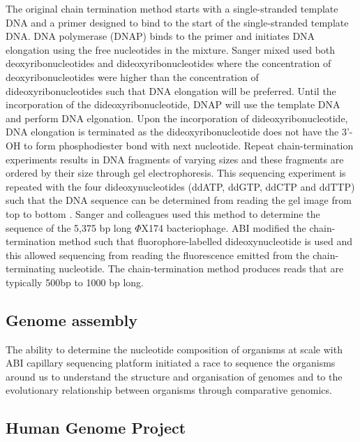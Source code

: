 The original chain termination method starts with a single-stranded template DNA and a primer designed to bind to the start of the single-stranded template DNA. DNA polymerase (DNAP) binds to the primer and initiates DNA elongation using the free nucleotides in the mixture. Sanger mixed used both deoxyribonucleotides and dideoxyribonucleotides where the concentration of deoxyribonucleotides were higher than the concentration of dideoxyribonucleotides such that DNA elongation will be preferred. Until the incorporation of the dideoxyribonucleotide, DNAP will use the template DNA and perform DNA elgonation. Upon the incorporation of dideoxyribonucleotide, DNA elongation is terminated as the dideoxyribonucleotide does not have the 3’-OH to form phosphodiester bond with next nucleotide. Repeat chain-termination experiments results in DNA fragments of varying sizes and these fragments are ordered by their size through gel electrophoresis. This sequencing experiment is repeated with the four dideoxynucleotides (ddATP, ddGTP, ddCTP and ddTTP) such that the DNA sequence can be determined from reading the gel image from top to bottom \cite{}. Sanger and colleagues used this method to determine the sequence of the 5,375 bp long $\Phi$X174 bacteriophage. ABI modified the chain-termination method such that fluorophore-labelled dideoxynucleotide is used and this allowed sequencing from reading the fluorescence emitted from the chain-terminating nucleotide. The chain-termination method produces reads that are typically 500bp to 1000 bp long. 


\subsection{Genome assembly}

The ability to determine the nucleotide composition of organisms at scale with ABI capillary sequencing platform initiated a race to sequence the organisms around us to understand the structure and organisation of genomes and to the evolutionary relationship between organisms through comparative genomics. 

\subsection{Human Genome Project}


